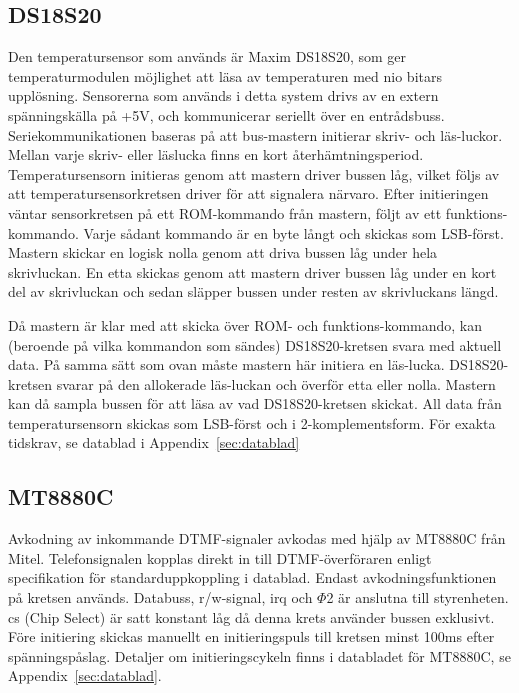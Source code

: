 \documentclass[a4paper,11pt]{article}
\begin{document}
	\subsection{DS18S20}
	\label{DS18S20}
		Den temperatursensor som används är Maxim DS18S20, som ger temperaturmodulen möjlighet att läsa av temperaturen
		med nio bitars upplösning. Sensorerna som används i detta system drivs av en extern spänningskälla på +5V,
		och kommunicerar seriellt över en entrådsbuss. Seriekommunikationen baseras på att bus-mastern initierar skriv-
		och läs-luckor. Mellan varje skriv- eller läslucka finns en kort återhämtningsperiod. Temperatursensorn initieras genom att mastern
		driver bussen låg, vilket följs av att temperatursensorkretsen driver för att signalera närvaro.
		Efter initieringen väntar sensorkretsen på ett ROM-kommando från mastern,
		följt av ett funktions-kommando. Varje sådant kommando är en byte långt och skickas som LSB-först. Mastern skickar
		en logisk nolla genom att driva bussen låg under hela skrivluckan. En etta skickas genom att mastern driver bussen låg
		under en kort del av skrivluckan och sedan släpper bussen under resten av skrivluckans längd. 

		Då mastern är klar med att skicka över ROM- och funktions-kommando, kan (beroende på vilka kommandon som sändes) DS18S20-kretsen
		svara med aktuell data. På samma sätt som ovan måste mastern här initiera en läs-lucka. 
		DS18S20-kretsen svarar på den allokerade läs-luckan och överför etta eller nolla. Mastern kan då sampla bussen för att läsa av vad DS18S20-kretsen skickat. All data från
		temperatursensorn skickas som LSB-först och i 2-komplementsform. För exakta tidskrav, se datablad i Appendix~\ref{sec:datablad}

	\subsection{MT8880C}
	\label{MT8880C}
		Avkodning av inkommande DTMF-signaler avkodas med hjälp av MT8880C från Mitel. 
		Telefonsignalen kopplas direkt in till DTMF-överföraren enligt specifikation för standarduppkoppling i datablad. Endast avkodningsfunktionen på 		kretsen används. Databuss, r/w-signal, irq och $\Phi$2 är anslutna till styrenheten. 
		cs (Chip Select) är satt konstant låg då denna krets använder bussen exklusivt. 
Före initiering skickas manuellt en initieringspuls till kretsen minst 100ms efter spänningspåslag. Detaljer om initieringscykeln finns i databladet för MT8880C, se Appendix~\ref{sec:datablad}.
\end{document}
